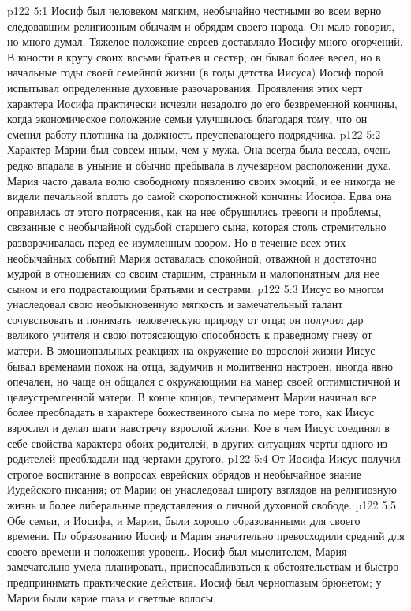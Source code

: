 \vs p122 5:1 Иосиф был человеком мягким, необычайно честными во всем верно следовавшим религиозным обычаям и обрядам своего народа. Он мало говорил, но много думал. Тяжелое положение евреев доставляло Иосифу много огорчений. В юности в кругу своих восьми братьев и сестер, он бывал более весел, но в начальные годы своей семейной жизни (в годы детства Иисуса) Иосиф порой испытывал определенные духовные разочарования. Проявления этих черт характера Иосифа практически исчезли незадолго до его безвременной кончины, когда экономическое положение семьи улучшилось благодаря тому, что он сменил работу плотника на должность преуспевающего подрядчика.
\vs p122 5:2 Характер Марии был совсем иным, чем у мужа. Она всегда была весела, очень редко впадала в уныние и обычно пребывала в лучезарном расположении духа. Мария часто давала волю свободному появлению своих эмоций, и ее никогда не видели печальной вплоть до самой скоропостижной кончины Иосифа. Едва она оправилась от этого потрясения, как на нее обрушились тревоги и проблемы, связанные с необычайной судьбой старшего сына, которая столь стремительно разворачивалась перед ее изумленным взором. Но в течение всех этих необычайных событий Мария оставалась спокойной, отважной и достаточно мудрой в отношениях со своим старшим, странным и малопонятным для нее сыном и его подрастающими братьями и сестрами.
\vs p122 5:3 Иисус во многом унаследовал свою необыкновенную мягкость и замечательный талант сочувствовать и понимать человеческую природу от отца; он получил дар великого учителя и свою потрясающую способность к праведному гневу от матери. В эмоциональных реакциях на окружение во взрослой жизни Иисус бывал временами похож на отца, задумчив и молитвенно настроен, иногда явно опечален, но чаще он общался с окружающими на манер своей оптимистичной и целеустремленной матери. В конце концов, темперамент Марии начинал все более преобладать в характере божественного сына по мере того, как Иисус взрослел и делал шаги навстречу взрослой жизни. Кое в чем Иисус соединял в себе свойства характера обоих родителей, в других ситуациях черты одного из родителей преобладали над чертами другого.
\vs p122 5:4 От Иосифа Иисус получил строгое воспитание в вопросах еврейских обрядов и необычайное знание Иудейского писания; от Марии он унаследовал широту взглядов на религиозную жизнь и более либеральные представления о личной духовной свободе.
\vs p122 5:5 Обе семьи, и Иосифа, и Марии, были хорошо образованными для своего времени. По образованию Иосиф и Мария значительно превосходили средний для своего времени и положения уровень. Иосиф был мыслителем, Мария --- замечательно умела планировать, приспосабливаться к обстоятельствам и быстро предпринимать практические действия. Иосиф был черноглазым брюнетом; у Марии были карие глаза и светлые волосы.
